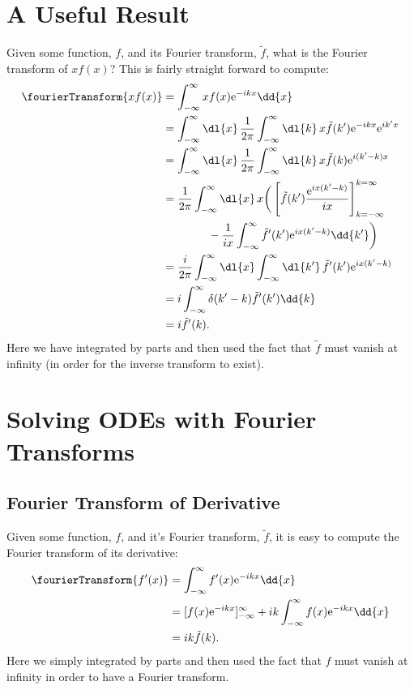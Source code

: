\documentclass[fleqn]{NotesClass}
\newcommand*{\e}{\mathrm{e}}
\begin{document}
    \section{A Useful Result}
    Given some function, \(f\), and its Fourier transform, \(\tilde{f}\), what is the Fourier transform of \(xf(x)\)?
    This is fairly straight forward to compute:
    \begin{align}
        \fourierTransform\{ xf(x) \} &= \int_{-\infty}^{\infty} xf(x) \e^{-ikx} \dd{x}\\
        &= \int_{-\infty}^{\infty} \dl{x} \, \frac{1}{2\pi} \int_{-\infty}^{\infty} \dl{k} \, x\tilde{f}(k') \e^{-ikx}\e^{ik'x}\\
        &= \int_{-\infty}^{\infty} \dl{x} \, \frac{1}{2\pi} \int_{-\infty}^{\infty} \dl{k} \, x\tilde{f}(k) \e^{i(k' - k)x}\\
        &= \frac{1}{2\pi} \int_{-\infty}^{\infty} \dl{x} \, x\bigg( \left[ \tilde{f}(k') \frac{\e^{ix(k' - k)}}{ix}  \right]_{k=-\infty}^{k=\infty}\notag\\
        &\hspace{4em}- \frac{1}{ix} \int_{-\infty}^{\infty} \tilde{f}'(k') \e^{ix(k' - k)} \dd{k'} \bigg)\\
        &= \frac{i}{2\pi} \int_{-\infty}^{\infty} \dl{x} \int_{-\infty}^{\infty} \dl{k'} \, \tilde{f}'(k') \e^{ix(k' - k)}\\
        &= i \int_{-\infty}^{\infty} \delta(k' - k)\tilde{f}'(k') \dd{k}\\
        &= i\tilde{f}'(k).
    \end{align}
    Here we have integrated by parts and then used the fact that \(\tilde{f}\) must vanish at infinity (in order for the inverse transform to exist).
    
    \section{Solving ODEs with Fourier Transforms}
    \subsection{Fourier Transform of Derivative}
    Given some function, \(f\), and it's Fourier transform, \(\tilde{f}\), it is easy to compute the Fourier transform of its derivative:
    \begin{align}
        \fourierTransform\{ f'(x) \} &= \int_{-\infty}^{\infty} f'(x) \e^{-ikx} \dd{x}\\
        &= [ f(x)\e^{-ikx} ]_{-\infty}^{\infty} + ik \int_{-\infty}^{\infty} f(x)\e^{-ikx} \dd{x}\\
        &= ik \tilde{f}(k).
    \end{align}
    Here we simply integrated by parts and then used the fact that \(f\) must vanish at infinity in order to have a Fourier transform.
    
\end{document}
